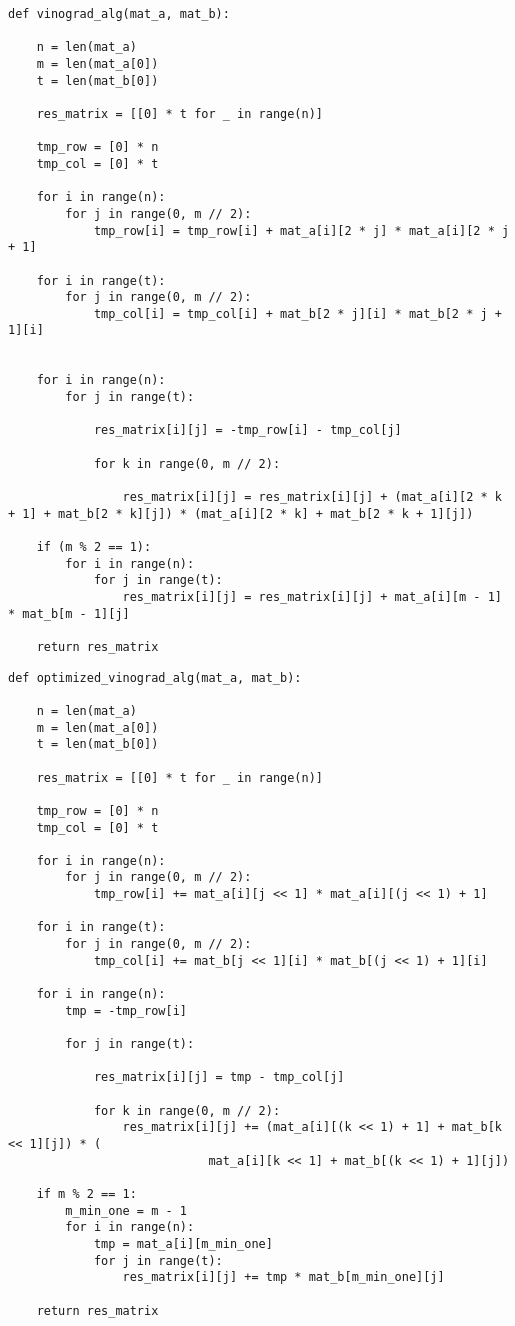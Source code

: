 \begin{center}
    \captionsetup{justification=raggedright,singlelinecheck=off}
    \begin{lstlisting}[label=lst:vin_alg,caption=Алгоритм Винограда умножения матриц]
def vinograd_alg(mat_a, mat_b):

	n = len(mat_a)
	m = len(mat_a[0])
	t = len(mat_b[0])

	res_matrix = [[0] * t for _ in range(n)]

	tmp_row = [0] * n
	tmp_col = [0] * t

	for i in range(n):
		for j in range(0, m // 2):
			tmp_row[i] = tmp_row[i] + mat_a[i][2 * j] * mat_a[i][2 * j + 1]

	for i in range(t):
		for j in range(0, m // 2):
			tmp_col[i] = tmp_col[i] + mat_b[2 * j][i] * mat_b[2 * j + 1][i] 


	for i in range(n):
		for j in range(t):

			res_matrix[i][j] = -tmp_row[i] - tmp_col[j]   

			for k in range(0, m // 2):

				res_matrix[i][j] = res_matrix[i][j] + (mat_a[i][2 * k + 1] + mat_b[2 * k][j]) * (mat_a[i][2 * k] + mat_b[2 * k + 1][j])

	if (m % 2 == 1):
		for i in range(n):
			for j in range(t):
				res_matrix[i][j] = res_matrix[i][j] + mat_a[i][m - 1] * mat_b[m - 1][j]

	return res_matrix
\end{lstlisting}
\end{center}


\begin{center}
    \captionsetup{justification=raggedright,singlelinecheck=off}
    \begin{lstlisting}[label=lst:opt_vin_alg,caption=Оптимизированный алгоритм Винограда умножения матриц]
def optimized_vinograd_alg(mat_a, mat_b):

	n = len(mat_a)
	m = len(mat_a[0])
	t = len(mat_b[0])

	res_matrix = [[0] * t for _ in range(n)]

	tmp_row = [0] * n
	tmp_col = [0] * t

	for i in range(n):
		for j in range(0, m // 2):
			tmp_row[i] += mat_a[i][j << 1] * mat_a[i][(j << 1) + 1]

	for i in range(t):
		for j in range(0, m // 2):
			tmp_col[i] += mat_b[j << 1][i] * mat_b[(j << 1) + 1][i]

	for i in range(n):
		tmp = -tmp_row[i]

		for j in range(t):

			res_matrix[i][j] = tmp - tmp_col[j]

			for k in range(0, m // 2):
				res_matrix[i][j] += (mat_a[i][(k << 1) + 1] + mat_b[k << 1][j]) * (
							mat_a[i][k << 1] + mat_b[(k << 1) + 1][j])

	if m % 2 == 1:
		m_min_one = m - 1
		for i in range(n):
			tmp = mat_a[i][m_min_one]
			for j in range(t):
				res_matrix[i][j] += tmp * mat_b[m_min_one][j]

	return res_matrix
\end{lstlisting}
\end{center}


